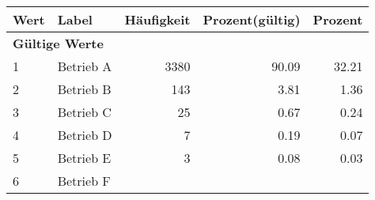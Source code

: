      \begin{longtable}{lXrrr}
     \toprule
     \textbf{Wert} & \textbf{Label} & \textbf{Häufigkeit} & \textbf{Prozent(gültig)} & \textbf{Prozent} \\
     \endhead
     \midrule
     \multicolumn{5}{l}{\textbf{Gültige Werte}}\\

     1 &
     \multicolumn{1}{X}{ Betrieb A   } &


       \num{3380} &
       \num[round-mode=places,round-precision=2]{90,09} &
         \num[round-mode=places,round-precision=2]{32,21} \\

     2 &
     \multicolumn{1}{X}{ Betrieb B   } &


       \num{143} &
       \num[round-mode=places,round-precision=2]{3,81} &
         \num[round-mode=places,round-precision=2]{1,36} \\

     3 &
     \multicolumn{1}{X}{ Betrieb C   } &


       \num{25} &
       \num[round-mode=places,round-precision=2]{0,67} &
         \num[round-mode=places,round-precision=2]{0,24} \\

     4 &
     \multicolumn{1}{X}{ Betrieb D   } &


       \num{7} &
       \num[round-mode=places,round-precision=2]{0,19} &
         \num[round-mode=places,round-precision=2]{0,07} \\

     5 &
     \multicolumn{1}{X}{ Betrieb E   } &


       \num{3} &
       \num[round-mode=places,round-precision=2]{0,08} &
         \num[round-mode=places,round-precision=2]{0,03} \\

     6 &
     \multicolumn{1}{X}{ Betrieb F   } &



\end{longtable}
